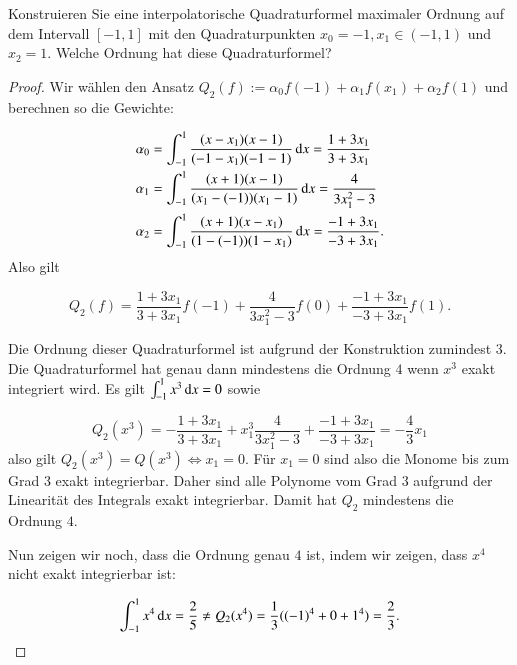 
\begin{exercise}
  Konstruieren Sie eine interpolatorische Quadraturformel maximaler Ordnung auf dem Intervall $[-1,1]$ mit den Quadraturpunkten $x_0=-1,x_1 \in (-1,1)$ und $x_2=1$. Welche Ordnung hat diese Quadraturformel?
\end{exercise}
\begin{proof}

  Wir wählen den Ansatz $Q_2(f):=\alpha_0f(-1)+\alpha_1 f(x_1)+\alpha_2f(1)$ und berechnen so die Gewichte:

  \begin{equation*}
    \begin{split}
      \alpha_0&=\int_{-1}^1{\frac{(x-x_1)(x-1)}{(-1-x_1)(-1-1)} \dif x}=\frac{1+3x_1}{3+3x_1} \\
      \alpha_1&=\int_{-1}^1{\frac{(x+1)(x-1)}{(x_1-(-1))(x_1-1)} \dif x}=\frac{4}{3x_1^2-3} \\
      \alpha_2&=\int_{-1}^1{\frac{(x+1)(x-x_1)}{(1-(-1))(1-x_1)} \dif x}=\frac{-1+3x_1}{-3+3x_1}. \\
    \end{split}
  \end{equation*}
  Also gilt

  \begin{equation*}
    Q_2(f)=\frac{1+3x_1}{3+3x_1}f(-1)+\frac{4}{3x_1^2-3}f(0)+\frac{-1+3x_1}{-3+3x_1}f(1).
  \end{equation*}

  Die Ordnung dieser Quadraturformel ist aufgrund der Konstruktion zumindest $3$. Die Quadraturformel hat genau dann mindestens die Ordnung $4$ wenn $x^3$ exakt integriert wird. Es gilt $\int_{-1}^1{x^3 \dif x}=0$ sowie

  \begin{equation*}
    Q_2(x^3)=-\frac{1+3x_1}{3+3x_1}+x_1^3\frac{4}{3x_1^2-3}+\frac{-1+3x_1}{-3+3x_1}=-\frac{4}{3}x_1
  \end{equation*}
  also gilt $Q_2(x^3)=Q(x^3) \iff x_1=0$. Für $x_1=0$ sind also die Monome bis zum Grad 3 exakt integrierbar. Daher sind alle Polynome vom Grad $3$ aufgrund der Linearität des Integrals exakt integrierbar. Damit hat $Q_2$ mindestens die Ordnung $4$.

  Nun zeigen wir noch, dass die Ordnung genau $4$ ist, indem wir zeigen, dass $x^4$ nicht exakt integrierbar ist:

  \begin{equation*}
    \int_{-1}^1{x^4 \dif x} = \frac{2}{5} \neq Q_2(x^4)=\frac{1}{3}({(-1)}^4 + 0 + 1^4) = \frac{2}{3}.
  \end{equation*}
\end{proof}
